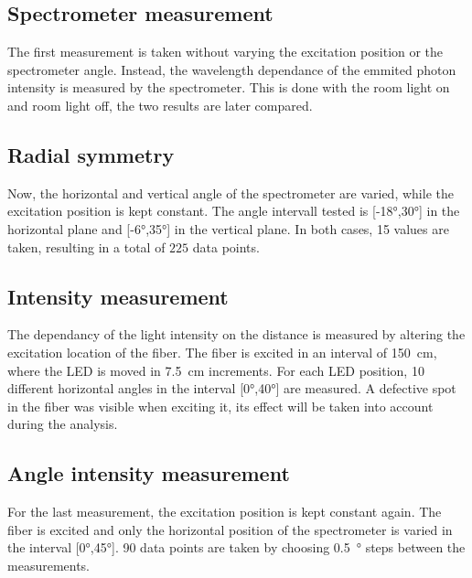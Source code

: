 \subsection{Spectrometer measurement}
The first measurement is taken without varying the excitation position or the spectrometer angle. Instead, the wavelength
dependance of the emmited photon intensity is measured by the spectrometer. This is done with the room light on and room light off,
the two results are later compared.

\subsection{Radial symmetry}
Now, the horizontal and vertical angle of the spectrometer are varied, while the excitation position is kept constant.
The angle intervall tested is [-18°,30°] in the horizontal plane and [-6°,35°] in the vertical plane. In both cases,
15 values are taken, resulting in a total of $225$ data points.

\subsection{Intensity measurement}
The dependancy of the light intensity on the distance is measured by altering the excitation location of the fiber.
The fiber is excited in an interval of \qty{150}{\centi\meter}, where the LED is moved in \qty{7.5}{\centi\meter}
increments. For each LED position, 10 different horizontal angles in the interval [0°,40°] are measured.
A defective spot in the fiber was visible when exciting it, its effect will be taken into account during the analysis.

\subsection{Angle intensity measurement}
For the last measurement, the excitation position is kept constant again. The fiber is excited and only the
horizontal position of the spectrometer is varied in the interval [0°,45°]. 90 data points are taken by choosing
\qty{0.5}{\degree} steps between the measurements.